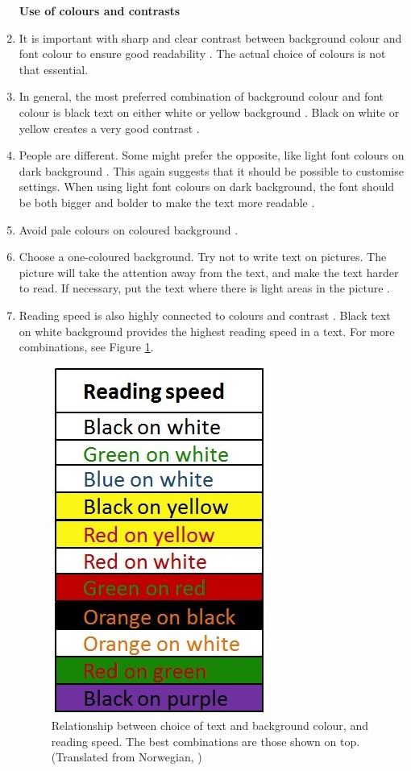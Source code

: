 \begin{enumerate}[{g}.1]
\textbf{Use of colours and contrasts}
\item It is important with sharp and clear contrast between background colour and font colour to ensure good readability \cite{blindeforbundetTekst} \cite{actionforblindpeopleTekst}. The actual choice of colours is not that essential.   
\item In general, the most preferred combination of background colour and font colour is black text on either white or yellow background \cite{actionforblindpeopleTekst}. Black on white or yellow creates a very good contrast \cite{blindeforbundetTekst}. 
\item People are different. Some might prefer the opposite, like light font colours on dark background \cite{blindeforbundetTekst}. This again suggests that it should be possible to customise settings. When using light font colours on dark background, the font should be both bigger and bolder to make the text more readable \cite{actionforblindpeopleTekst}.
\item Avoid pale colours on coloured background \cite{blindeforbundetTekst}.  
\item Choose a one-coloured background. Try not to write text on pictures. The picture will take the attention away from the text, and make the text harder to read. If necessary, put the text where there is light areas in the picture  \cite{blindeforbundetTekst}.  
\item Reading speed is also highly connected to colours and contrast  \cite{blindeforbundetTekst}. Black text on white background provides the highest reading speed in a text. For more combinations, see Figure \ref{fig:contrastreadingspeed}.

\begin{figure} [ht!]
\centering
\includegraphics[scale=0.5]{readingcolors.jpg}
\caption[Colours and contrasts - reading speed]{Relationship between choice of text and background colour, and reading speed. The best combinations are those shown on top. (Translated from Norwegian, \cite{blindeforbundetTekst})}
\label{fig:contrastreadingspeed}
\end{figure}


\end{enumerate}
